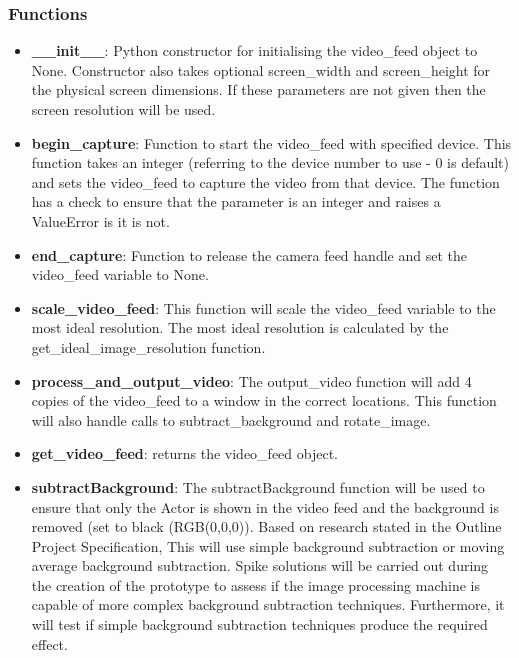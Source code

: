 \documentclass{article}
\begin{document}
\subsubsection{Functions}

\begin{itemize}
	\item \textbf{\_\_init\_\_}: Python constructor for initialising the video\_feed object to None. Constructor also takes optional screen\_width and screen\_height for the physical screen dimensions. If these parameters are not given then the screen resolution will be used.
	
	\item \textbf{begin\_capture}: Function to start the video\_feed with specified device. This function takes an integer (referring to the device number to use - 0 is default) and sets the video\_feed to capture the video from that device. The function has a check to ensure that the parameter is an integer and raises a ValueError is it is not.
	
	\item \textbf{end\_capture}: Function to release the camera feed handle and set the video\_feed variable to None.
	
	\item \textbf{scale\_video\_feed}: This function will scale the video\_feed variable to the most ideal resolution. The most ideal resolution is calculated by the get\_ideal\_image\_resolution function. 
	
	\item \textbf{process\_and\_output\_video}: The output\_video function will add  4 copies of the video\_feed to a window in the correct locations. This function will also handle calls to subtract\_background and rotate\_image.
	
	\item \textbf{get\_video\_feed}: returns the video\_feed object.   

	\item \textbf{subtractBackground}: The subtractBackground function will be used to ensure that only the Actor is shown in the video feed and the background is removed (set to black (RGB(0,0,0)). Based on research stated in the Outline Project Specification, This will use simple background subtraction or moving average background subtraction. Spike solutions will be carried out during the creation of the prototype to assess if the image processing machine is capable of more complex background subtraction techniques. Furthermore, it will test if simple background subtraction techniques produce the required effect.

\end{itemize}
\end{document}
